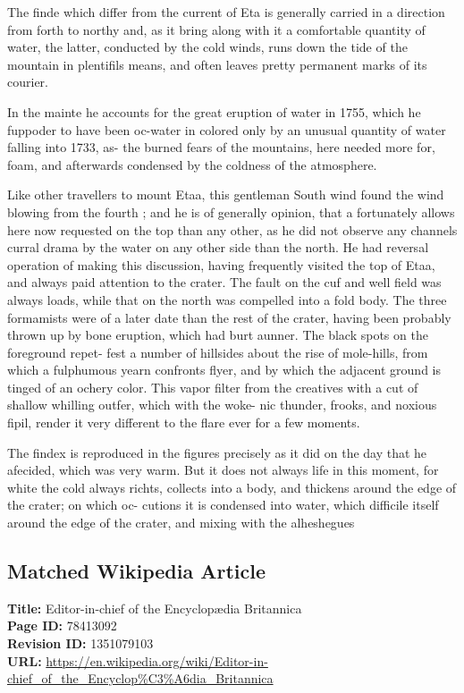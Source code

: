 \documentclass{article}
\begin{document}
The finde which differ from the current of Eta is generally carried in a direction from forth to northy and, as it bring along with it a comfortable quantity of water, the latter, conducted by the cold winds, runs down the tide of the mountain in plentifils means, and often leaves pretty permanent marks of its courier.

In the mainte he accounts for the great eruption of water in 1755, which he fuppoder to have been oc-water in colored only by an unusual quantity of water falling into 1733, as- the burned fears of the mountains, here needed more for, foam, and afterwards condensed by the coldness of the atmosphere.

Like other travellers to mount Etaa, this gentleman South wind found the wind blowing from the fourth ; and he is of generally opinion, that a fortunately allows here now requested on the top than any other, as he did not observe any channels curral drama by the water on any other side than the north. He had reversal operation of making this discussion, having frequently visited the top of Etaa, and always paid attention to the crater. The fault on the cuf and well field was always loads, while that on the north was compelled into a fold body. The three formamists were of a later date than the rest of the crater, having been probably thrown up by bone eruption, which had burt aunner. The black spots on the foreground repet- fest a number of hillsides about the rise of mole-hills, from which a fulphumous yearn confronts flyer, and by which the adjacent ground is tinged of an ochery color. This vapor filter from the creatives with a cut of shallow whilling outfer, which with the woke- nic thunder, frooks, and noxious fipil, render it very different to the flare ever for a few moments.

The findex is reproduced in the figures precisely as it did on the day that he afecided, which was very warm. But it does not always life in this moment, for white the cold always richts, collects into a body, and thickens around the edge of the crater; on which oc- cutions it is condensed into water, which difficile itself around the edge of the crater, and mixing with the alheshegues

\subsection*{Matched Wikipedia Article}
\textbf{Title:} Editor-in-chief of the Encyclopædia Britannica \\
\textbf{Page ID:} 78413092 \\
\textbf{Revision ID:} 1351079103 \\
\textbf{URL:} \url{https://en.wikipedia.org/wiki/Editor-in-chief\_of\_the\_Encyclop\%C3\%A6dia\_Britannica}
\end{document}
